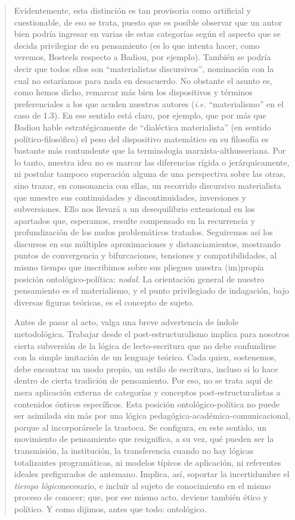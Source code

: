 \begin{quote}
Evidentemente, esta distinción es tan provisoria como artificial y cuestionable, de eso se trata, puesto que es posible observar que un autor bien podría ingresar en varias de estas categorías según el aspecto que se decida privilegiar de su pensamiento (es lo que intenta hacer, como veremos, Bosteels respecto a Badiou, por ejemplo). También se podría decir que todos ellos son \enquote{materialistas discursivos}, nominación con la cual no estaríamos para nada en desacuerdo. No obstante el asunto es, como hemos dicho, remarcar más bien los dispositivos y términos preferenciales a los que acuden nuestros autores (\emph{i.e.} \enquote{materialismo} en el caso de 1.3). En ese sentido está claro, por ejemplo, que por más que Badiou hable estratégicamente de \enquote{dialéctica materialista} (en sentido político-filosófico) el peso del dispositivo matemático en su filosofía es bastante más contundente que la terminología marxista-althusseriana. Por lo tanto, nuestra idea no es marcar las diferencias rígida o jerárquicamente, ni postular tampoco superación alguna de una perspectiva sobre las otras, sino trazar, en consonancia con ellas, un recorrido discursivo materialista que muestre sus continuidades y discontinuidades, inversiones y subversiones. Ello nos llevará a un desequilibrio extensional en los apartados que, esperamos, resulte compensado en la recurrencia y profundización de los nudos problemáticos tratados. Seguiremos así los discursos en sus múltiples aproximaciones y distanciamientos, mostrando puntos de convergencia y bifurcaciones, tensiones y compatibilidades, al mismo tiempo que inscribimos sobre sus pliegues nuestra (im)propia posición ontológico-política: \emph{nodal}. La orientación general de nuestro pensamiento es el materialismo, y el punto privilegiado de indagación, bajo diversas figuras teóricas, es el concepto de sujeto.

Antes de pasar al acto, valga una breve advertencia de índole metodológica. Trabajar desde el post-estructuralismo implica para nosotros cierta subversión de la lógica de lecto-escritura que no debe confundirse con la simple imitación de un lenguaje teórico. Cada quien, sostenemos, debe encontrar un modo propio, un estilo de escritura, incluso si lo hace dentro de cierta tradición de pensamiento. Por eso, no se trata aquí de mera aplicación externa de categorías y conceptos post-estructuralistas a contenidos ónticos específicos. Esta posición ontológico-política no puede ser asimilada sin más por una lógica pedagógica-académica-comunicacional, porque al incorporársele la trastoca. Se configura, en este sentido, un movimiento de pensamiento que resignifica, a su vez, qué pueden ser la transmisión, la institución, la transferencia cuando no hay lógicas totalizantes programáticas, ni modelos típicos de aplicación, ni referentes ideales prefigurados de antemano. Implica, así, soportar la incertidumbre el \emph{tiempo lógico}necesario, e incluir al sujeto de conocimiento en el mismo proceso de conocer; que, por ese mismo acto, deviene también ético y político. Y como dijimos, antes que todo: ontológico.


\end{quote}
